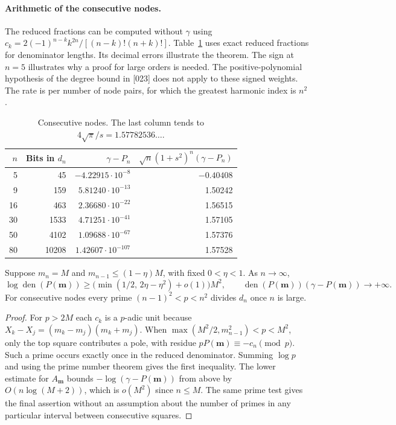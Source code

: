\documentclass[11pt,a4paper,oneside,openany]{report}
\theoremstyle{remark}\newtheorem{remark}[theorem]{Remark}
\numberwithin{equation}{section}
\begin{document}
\paragraph{Arithmetic of the consecutive nodes.}
The reduced fractions can be computed without $\gamma$ using
$c_k=2(-1)^{n-k}k^{2n}/[(n-k)!(n+k)!]$. Table~\ref{ch3:sq:table} uses exact reduced fractions for denominator lengths. Its decimal errors illustrate the theorem. The sign at $n=5$ illustrates why a proof for large orders is needed. The positive-polynomial hypothesis of the degree bound in [023] does not apply to these signed weights. The rate is per number of node pairs, for which the greatest harmonic index is $n^2$.
\begin{table}[ht]\centering\small
\begin{tabular}{r r r r}\toprule
$n$ & Bits in $d_n$ & $\gamma-P_n$ & $\sqrt n(1+s^2)^n(\gamma-P_n)$\\\midrule
5&45&$-4.22915\cdot10^{-8}$&$-0.40408$\\
9&159&$5.81240\cdot10^{-13}$&1.50242\\
16&463&$2.36680\cdot10^{-22}$&1.56515\\
30&1533&$4.71251\cdot10^{-41}$&1.57105\\
50&4102&$1.09688\cdot10^{-67}$&1.57376\\
80&10208&$1.42607\cdot10^{-107}$&1.57528\\\bottomrule
\end{tabular}
\caption{Consecutive nodes. The last column tends to $4\sqrt{\pi}/s=1.57782536\ldots$.}
\label{ch3:sq:table}
\end{table}

\begin{proposition}\label{ch3:sq:isolated}
Suppose $m_n=M$ and $m_{n-1}\le(1-\eta)M$, with fixed $0<\eta<1$. As $n\to\infty$,
\[
 \log\operatorname{den}(P(\mathbf m))\ge
   \bigl(\min(1/2,\,2\eta-\eta^2)+o(1)\bigr)M^2,\qquad
 \operatorname{den}(P(\mathbf m))(\gamma-P(\mathbf m))\to+\infty .
\]
For consecutive nodes every prime $(n-1)^2<p<n^2$ divides $d_n$ once $n$ is large.
\end{proposition}
\begin{proof}
For $p>2M$ each $c_k$ is a $p$-adic unit because $X_k-X_j=(m_k-m_j)(m_k+m_j)$. When $\max(M^2/2,m_{n-1}^2)<p<M^2$, only the top square contributes a pole, with residue $pP(\mathbf m)\equiv-c_n\pmod p$. Such a prime occurs exactly once in the reduced denominator. Summing $\log p$ and using the prime number theorem gives the first inequality. The lower estimate for $A_{\mathbf m}$ bounds $-\log(\gamma-P(\mathbf m))$ from above by $O(n\log(M+2))$, which is $o(M^2)$ since $n\le M$. The same prime test gives the final assertion without an assumption about the number of primes in any particular interval between consecutive squares.
\end{proof}
\end{document}
